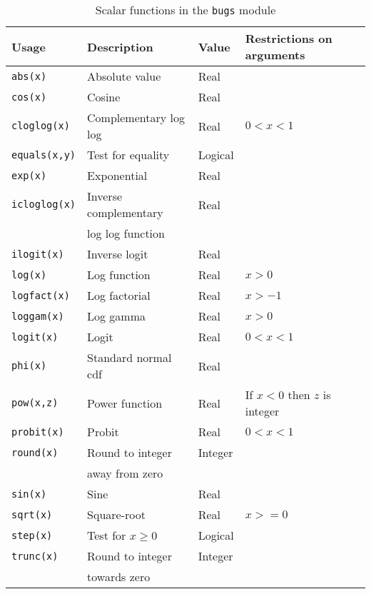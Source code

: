 \documentclass[11pt, a4paper, titlepage]{report}
\begin{document}
\begin{table}
\begin{center}
\begin{tabular}{llll}
\hline
Usage  & Description & Value & Restrictions on arguments \\ 
\hline
\verb+abs(x)+       & Absolute value      & Real & \\
\verb+cos(x)+       & Cosine              & Real & \\
\verb+cloglog(x)+   & Complementary log log & Real & $0 < x < 1$ \\
\verb+equals(x,y)+  & Test for equality   & Logical & \\
\verb+exp(x)+       & Exponential         & Real & \\
\verb+icloglog(x)+  & Inverse complementary & Real & \\
                    & log log function    & \\
\verb+ilogit(x)+    & Inverse logit       & Real & \\
\verb+log(x)+       & Log function        & Real & $x > 0$ \\
\verb+logfact(x)+   & Log factorial       & Real & $x > -1$ \\
\verb+loggam(x)+    & Log gamma           & Real & $x > 0$ \\
\verb+logit(x)+     & Logit               & Real & $0 < x < 1$ \\
\verb+phi(x)+       & Standard normal cdf & Real & \\
\verb+pow(x,z)+     & Power function      & Real & If $x < 0$ then $z$ is integer \\ 
\verb+probit(x)+    & Probit              & Real & $0 < x < 1$ \\
\verb+round(x)+     & Round to integer    & Integer & \\
                    & away from zero      &      & \\
\verb+sin(x)+       & Sine                & Real & \\
\verb+sqrt(x)+      & Square-root         & Real & $x >= 0$ \\
\verb+step(x)+      & Test for $x \geq 0$ & Logical & \\
\verb+trunc(x)+     & Round to integer    & Integer & \\
                    & towards zero        & \\
\hline
\end{tabular}
\caption{Scalar functions in the \texttt{bugs} module \label{table:bugs:scalar}}
\end{center}
\end{table}
\end{document}
